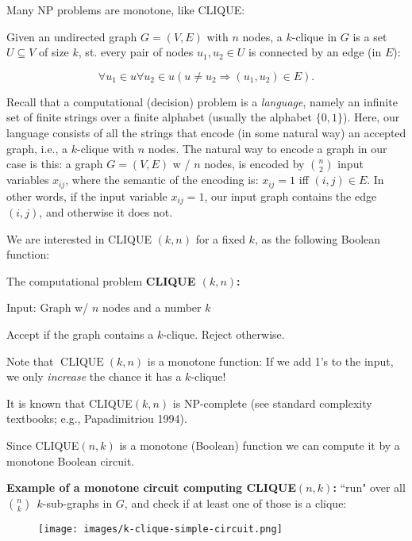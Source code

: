 Many NP problems are monotone, like CLIQUE:

Given an undirected graph $G=(V, E)$ with $n$ nodes, a $k$-clique in $G$ is a set $U\subseteq V$ of size $k$, st. every pair of nodes $u_1, u_2 \in U$ is connected by an edge (in $E$):

$$
 \forall u_1 \in u \forall u_2 \in u ( u \neq u_2\Rightarrow (u_1, u_2)\in E).
$$


Recall that a computational (decision) problem is a \emph{language}, namely an infinite set of finite strings over a finite alphabet (usually the alphabet $\{0,1\}$). Here, our language consists of all the strings that encode (in some natural way) an accepted graph, i.e., a $k$-clique with $n$ nodes.
The natural way to encode a graph in our case is this: a graph  $G=(V, E) $ w / $n$ nodes, is encoded by $\binom{n}{2}$ input variables  $x_{ij}$, where the semantic of the encoding is: $x_{i j}=1$ iff $(i, j) \in E$. In other words, if the input variable $x_{ij}=1$,   our input graph contains the edge $(i,j)$, and otherwise it does not. 

We are interested in CLIQUE $(k, n)$ for a fixed $k$, as the following Boolean function: 
\begin{svgraybox}
The computational problem \textbf{CLIQUE $(k, n)$:}  

Input: Graph w/ $n$ nodes and a number $k$

Accept if the graph contains a $k$-clique. Reject otherwise.
\end{svgraybox}


 Note that $\operatorname{CLIQUE}(k, n)$ is a monotone function: If we add 1's to the input, we only \emph{increase} the chance it has a $k$-clique!
 
It is known that CLIQUE$(k,n)$ is NP-complete (see standard complexity textbooks; e.g., Papadimitriou 1994).


Since CLIQUE$(n, k)$ is a monotone (Boolean)
function we can compute it by a monotone Boolean circuit.
\medskip 

\textbf{Example of a monotone circuit computing CLIQUE$(n, k)$:} ``run" over all $\binom{n}{k} ~~ k$-sub-graphs in $G$, and check if at least one of those is a clique:

\begin{figure}
    \centering
    \texttt{[image: images/k-clique-simple-circuit.png]}
    \label{fig:enter-label}
\end{figure}





